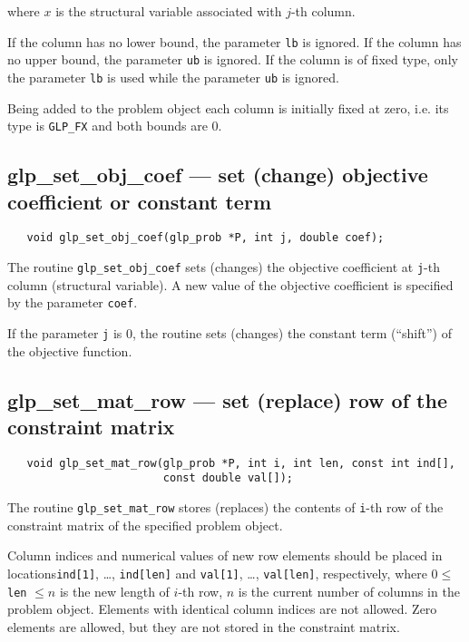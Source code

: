 \noindent
where $x$ is the structural variable associated with $j$-th column.

If the column has no lower bound, the parameter \verb|lb| is ignored.
If the column has no upper bound, the parameter \verb|ub| is ignored.
If the column is of fixed type, only the parameter \verb|lb| is used
while the parameter \verb|ub| is ignored.

Being added to the problem object each column is initially fixed at
zero, i.e. its type is \verb|GLP_FX| and both bounds are 0.


\subsection{glp\_set\_obj\_coef --- set (change) objective coefficient
or constant term}

\synopsis

\begin{verbatim}
   void glp_set_obj_coef(glp_prob *P, int j, double coef);
\end{verbatim}

\description

The routine \verb|glp_set_obj_coef| sets (changes) the objective
coefficient at \verb|j|-th column (structural variable). A new value of
the objective coefficient is specified by the parameter \verb|coef|.

If the parameter \verb|j| is 0, the routine sets (changes) the constant
term (``shift'') of the objective function.

\newpage

\subsection{glp\_set\_mat\_row --- set (replace) row of the constraint
matrix}

\synopsis

\begin{verbatim}
   void glp_set_mat_row(glp_prob *P, int i, int len, const int ind[],
                        const double val[]);
\end{verbatim}

\description

The routine \verb|glp_set_mat_row| stores (replaces) the contents of
\verb|i|-th row of the constraint matrix of the specified problem
object.

Column indices and numerical values of new row elements should be
placed in locations\linebreak \verb|ind[1]|, \dots, \verb|ind[len]| and
\verb|val[1]|, \dots, \verb|val[len]|, respectively, where
$0 \leq$ \verb|len| $\leq n$ is the new length of $i$-th row, $n$ is
the current number of columns in the problem object. Elements with
identical column indices are not allowed. Zero elements are allowed,
but they are not stored in the constraint matrix.

